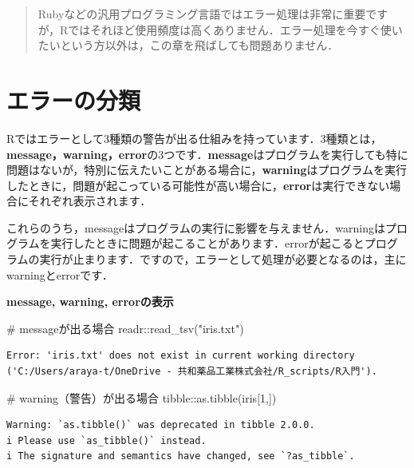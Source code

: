\documentclass[
  letterpaper,
  DIV=11,
  numbers=noendperiod]{scrreprt}
\newenvironment{Shaded}{\begin{snugshade}}{\end{snugshade}}
\newcommand{\CommentTok}[1]{\textcolor[rgb]{0.37,0.37,0.37}{#1}}
\newcommand{\DecValTok}[1]{\textcolor[rgb]{0.68,0.00,0.00}{#1}}
\newcommand{\FunctionTok}[1]{\textcolor[rgb]{0.28,0.35,0.67}{#1}}
\newcommand{\NormalTok}[1]{\textcolor[rgb]{0.00,0.23,0.31}{#1}}
\newcommand{\SpecialCharTok}[1]{\textcolor[rgb]{0.37,0.37,0.37}{#1}}
\newcommand{\StringTok}[1]{\textcolor[rgb]{0.13,0.47,0.30}{#1}}
\begin{document}
\begin{quote}
Rubyなどの汎用プログラミング言語ではエラー処理は非常に重要ですが，Rではそれほど使用頻度は高くありません．エラー処理を今すぐ使いたいという方以外は，この章を飛ばしても問題ありません．
\end{quote}

\hypertarget{ux30a8ux30e9ux30fcux306eux5206ux985e}{%
\section{エラーの分類}\label{ux30a8ux30e9ux30fcux306eux5206ux985e}}

Rではエラーとして3種類の警告が出る仕組みを持っています．3種類とは，\textbf{message，warning，error}の3つです．\textbf{message}はプログラムを実行しても特に問題はないが，特別に伝えたいことがある場合に，\textbf{warning}はプログラムを実行したときに，問題が起こっている可能性が高い場合に，\textbf{error}は実行できない場合にそれぞれ表示されます．

これらのうち，messageはプログラムの実行に影響を与えません．warningはプログラムを実行したときに問題が起こることがあります．errorが起こるとプログラムの実行が止まります．ですので，エラーとして処理が必要となるのは，主にwarningとerrorです．

\textbf{message, warning, errorの表示}

\begin{Shaded}
\begin{Highlighting}[]
\CommentTok{\# messageが出る場合}
\NormalTok{readr}\SpecialCharTok{::}\FunctionTok{read\_tsv}\NormalTok{(}\StringTok{"iris.txt"}\NormalTok{)}
\end{Highlighting}
\end{Shaded}

\begin{verbatim}
Error: 'iris.txt' does not exist in current working directory ('C:/Users/araya-t/OneDrive - 共和薬品工業株式会社/R_scripts/R入門').
\end{verbatim}

\begin{Shaded}
\begin{Highlighting}[]
\CommentTok{\# warning（警告）が出る場合}
\NormalTok{tibble}\SpecialCharTok{::}\FunctionTok{as.tibble}\NormalTok{(iris[}\DecValTok{1}\NormalTok{,])}
\end{Highlighting}
\end{Shaded}

\begin{verbatim}
Warning: `as.tibble()` was deprecated in tibble 2.0.0.
i Please use `as_tibble()` instead.
i The signature and semantics have changed, see `?as_tibble`.
\end{verbatim}
\end{document}

